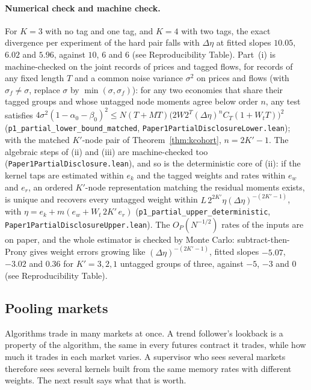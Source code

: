 \documentclass[12pt]{article}
\theoremstyle{definition}
\theoremstyle{remark}
\begin{document}
\paragraph{Numerical check and machine check.} For $K=3$ with no tag and one tag, and $K=4$ with two tags, the exact divergence per experiment of the hard pair falls with $\Delta\eta$ at fitted slopes $10.05$, $6.02$ and $5.96$, against $10$, $6$ and $6$ (see Reproducibility Table). Part~(i) is machine-checked on the joint records of prices and tagged flows, for records of any fixed length $T$ and a common noise variance $\sigma^2$ on prices and flows (with $\sigma_f\ne\sigma$, replace $\sigma$ by $\min(\sigma,\sigma_f)$): for any two economies that share their tagged groups and whose untagged node moments agree below order $n$, any test satisfies $4\sigma^2(1-\alpha_0-\beta_0)^2\le N(T+MT)\bigl(2W2^T(\Delta\eta)^nC_T(1+W_tT)\bigr)^2$ (\texttt{p1\_partial\_lower\_bound\_matched}, \nolinkurl{Paper1PartialDisclosureLower.lean}); with the matched $K'$-node pair of Theorem~\ref{thm:kcohort}, $n=2K'-1$. The algebraic steps of (ii) and (iii) are machine-checked too (\nolinkurl{Paper1PartialDisclosure.lean}), and so is the deterministic core of (ii): if the kernel taps are estimated within $e_k$ and the tagged weights and rates within $e_w$ and $e_r$, an ordered $K'$-node representation matching the residual moments exists, is unique and recovers every untagged weight within $L\,2^{2K'}\eta(\Delta\eta)^{-(2K'-1)}$, with $\eta=e_k+m(e_w+W_t\,2K'\,e_r)$ (\texttt{p1\_partial\_upper\_deterministic}, \nolinkurl{Paper1PartialDisclosureUpper.lean}). The $O_P(N^{-1/2})$ rates of the inputs are on paper, and the whole estimator is checked by Monte Carlo: subtract-then-Prony gives weight errors growing like $(\Delta\eta)^{-(2K'-1)}$, fitted slopes $-5.07$, $-3.02$ and $0.36$ for $K'=3,2,1$ untagged groups of three, against $-5$, $-3$ and $0$ (see Reproducibility Table).

\subsection{Pooling markets}\label{sec:pool}

Algorithms trade in many markets at once. A trend follower's lookback is a property of the algorithm, the same in every futures contract it trades, while how much it trades in each market varies. A supervisor who sees several markets therefore sees several kernels built from the same memory rates with different weights. The next result says what that is worth.
\end{document}
